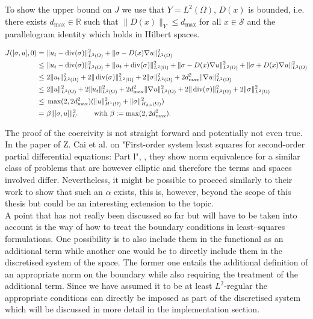 \documentclass[../draft_1.tex]{subfiles}
\begin{document}
To show the upper bound on $J$ we use that $Y = L^2(\Omega)$, $D(x)$ is bounded, i.e. there exists $d_{\text{max}} \in \mathbb{R}$ such that $\| D(x) \|_Y \leq d_{\text{max}}$ for all $x \in \mathcal{S}$ and the parallelogram identity which holds in Hilbert spaces. 
\begin{ceqn}
	\begin{equation}
	\begin{aligned}
	J([\sigma, u], 0) = \  & \| u_t - \mathop{}\!\mathrm{div}(\sigma) \|_{L^2(\Omega)}^2 + \| \sigma - D(x) \nabla u \|_{L^2(\Omega)}^2 \\  
	\leq \ & \| u_t - \mathop{}\!\mathrm{div}(\sigma) \|_{L^2(\Omega)}^2 + \| u_t + \mathop{}\!\mathrm{div}(\sigma) \|_{L^2(\Omega)}^2 + \| \sigma - D(x) \nabla u \|_{L^2(\Omega)}^2 +  \| \sigma + D(x) \nabla u \|_{L^2(\Omega)}^2 \\
	\leq \ & 2 \| u_t \|_{L^2(\Omega)}^2 + 2 \| \mathop{}\!\mathrm{div}(\sigma) \|_{L^2(\Omega)}^2 + 2 \| \sigma \|_{L^2(\Omega)}^2+ 2 d_{\max}^2 \| \nabla u \|_{L^2(\Omega)}^2  \\
	\leq \ & 2 \| u \|_{L^2(\Omega)}^2 + 2 \| u_t \|_{L^2(\Omega)}^2 + 2 d_{\max}^2 \| \nabla u \|_{L^2(\Omega)}^2 + 2 \| \mathop{}\!\mathrm{div}(\sigma) \|_{L^2(\Omega)}^2 + 2 \| \sigma \|_{L^2(\Omega)}^2 \\
	\leq \ & \max(2, 2 d_{\max}^2) (\| u \|_{H^1(\Omega)}^2 + \| \sigma \|_{H_{\mathop{}\!\mathrm{div}}(\Omega)}^2)	\\
	=  \ & \beta \| [\sigma, u] \|_U^2 \qquad \text{ with } \beta:= \max(2, 2 d_{\max}^2).
	\end{aligned}
	\end{equation}
\end{ceqn}
The proof of the coercivity is not straight forward and potentially not even true. In the paper of Z. Cai et al. on "First-order system least squares for second-order partial differential equations: Part l", \cite{cai1994first}, they show norm equivalence for a similar class of problems that are however elliptic and therefore the terms and spaces involved differ. Nevertheless, it might be possible to proceed similarly to their work to show that such an $\alpha$ exists, this is, however, beyond the scope of this thesis but could be an interesting extension to the topic.
\smallskip
\\
A point that has not really been discussed so far but will have to be taken into account is the way of how to treat the boundary conditions in least--squares formulations. One possibility is to also include them in the functional as an additional term while another one would be to directly include them in the discretised system of the space. The former one entails the additional definition of an appropriate norm on the boundary while also requiring the treatment of the additional term. Since we have assumed it to be at least $L^2$-regular the appropriate conditions can directly be imposed as part of the discretised system which will be discussed in more detail in the implementation section.
\end{document}
